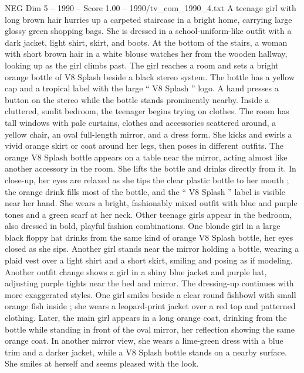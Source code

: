 \begin{textsample}{NEG Dim 5 – 1990 – Score 1.00 – 1990/tv\_com\_1990\_4.txt}  \label{ex:f5_neg_087}
A teenage girl with long brown hair hurries up a carpeted staircase in a bright home, carrying large glossy green shopping bags.
She is dressed in a school-uniform-like outfit with a dark jacket, light shirt, skirt, and boots.
At the bottom of the stairs, a woman with short brown hair in a white blouse watches her from the wooden hallway, looking up as the girl climbs past.
The girl reaches a room and sets a bright orange bottle of V8 Splash beside a black stereo system.
The bottle has a yellow cap and a tropical label with the large “ V8 Splash ” logo.
A hand presses a button on the stereo while the bottle stands prominently nearby.
Inside a cluttered, sunlit bedroom, the teenager begins trying on clothes.
The room has tall windows with pale curtains, clothes and accessories scattered around, a yellow chair, an oval full-length mirror, and a dress form.
She kicks and swirls a vivid orange skirt or coat around her legs, then poses in different outfits.
The orange V8 Splash bottle appears on a table near the mirror, acting almost like another accessory in the room.
She lifts the bottle and drinks directly from it.
In close-up, her eyes are relaxed as she tips the clear plastic bottle to her mouth ; the orange drink fills most of the bottle, and the “ V8 Splash ” label is visible near her hand.
She wears a bright, fashionably mixed outfit with blue and purple tones and a green scarf at her neck.
Other teenage girls appear in the bedroom, also dressed in bold, playful fashion combinations.
One blonde girl in a large black floppy hat drinks from the same kind of orange V8 Splash bottle, her eyes closed as she sips.
Another girl stands near the mirror holding a bottle, wearing a plaid vest over a light shirt and a short skirt, smiling and posing as if modeling.
Another outfit change shows a girl in a shiny blue jacket and purple hat, adjusting purple tights near the bed and mirror.
The dressing-up continues with more exaggerated styles.
One girl smiles beside a clear round fishbowl with small orange fish inside ; she wears a leopard-print jacket over a red top and patterned clothing.
Later, the main girl appears in a long orange coat, drinking from the bottle while standing in front of the oval mirror, her reflection showing the same orange coat.
In another mirror view, she wears a lime-green dress with a blue trim and a darker jacket, while a V8 Splash bottle stands on a nearby surface.
She smiles at herself and seems pleased with the look.

\end{textsample}

